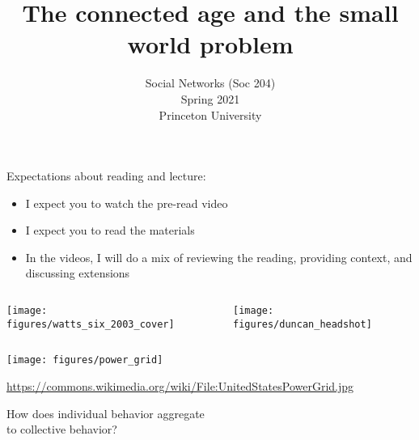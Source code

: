 \documentclass[aspectratio=169]{beamer}
\title[]{The connected age and the small world problem}
\author[]{Social Networks (Soc 204)\\Spring 2021\\Princeton University}
\institute[]{Matthew J. Salganik}
\date[]{Week 1, Lecture 2\\ Video 1/3: Introduction

\vfill

\begin{flushleft}
\vspace{0.7in}
\texttt{[image: figures/cc.png]}
\end{flushleft}
}
\begin{document}
\frame{\titlepage}
\begin{frame}

Expectations about reading and lecture:
\begin{itemize}
\item I expect you to watch the pre-read video
\pause
\item I expect you to read the materials
\pause
\item In the videos, I will do a mix of reviewing the reading, providing context, and discussing extensions 
\end{itemize}

\end{frame}
\begin{frame}

\begin{columns}
\begin{column}{0.5\textwidth}
  \begin{center}
    \texttt{[image: figures/watts\_six\_2003\_cover]}
  \end{center}
\end{column}
\begin{column}{0.5\textwidth}  
\pause
    \begin{center}
     \texttt{[image: figures/duncan\_headshot]}
     \end{center}
\end{column}
\end{columns}


\end{frame}
\begin{frame}

\begin{center}
\texttt{[image: figures/power\_grid]}
\end{center}

\vfill
\tiny{\url{https://commons.wikimedia.org/wiki/File:UnitedStatesPowerGrid.jpg}}


\end{frame}
\begin{frame}

\begin{center}
\Large{
How does individual behavior aggregate\\ to collective behavior?
}
\end{center}


\end{frame}
\end{document}
